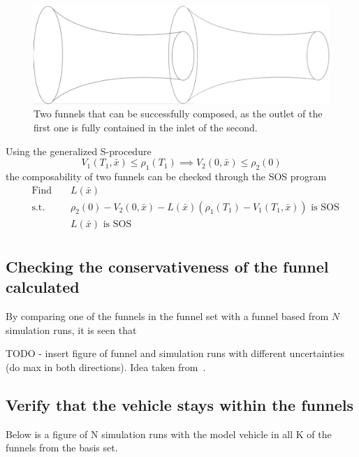 \begin{figure}
  \includegraphics[scale=.2]{figures/method/funnel-composition} \centering
  \caption{Two funnels that can be successfully composed, as the outlet of the
    first one is fully contained in the inlet of the second.}
  \label{fig:two-funnels-composed}
\end{figure}

Using the generalized S-procedure
\begin{equation}
  V_1(T_1,\bar{x}) \leq \rho_1(T_1) \implies V_2(0, \bar{x}) \leq \rho_2(0)
\end{equation}
the composability of two funnels can be checked through the \ac{SOS} program
\begin{align*}
    & \text{Find } && L(\bar{x}) \\
    & \text{s.t. } && \rho_2(0) - V_2(0,\bar{x}) - L(\bar{x})\left( \rho_1(T_1) - V_1(T_1,\bar{x}) \right) \text{ is SOS} \\
    &&& L(\bar{x}) \text{ is SOS} \\
\end{align*}

\subsection{Checking the conservativeness of the funnel calculated}

By comparing one of the funnels in the funnel set with a funnel based from \(N\)
simulation runs, it is seen that

TODO - insert figure of funnel and simulation runs with different uncertainties
(do max in both directions).
Idea taken from~\cite{mooreControlSynthesisVerification2012}.

\subsection{Verify that the vehicle stays within the funnels}

Below is a figure of N simulation runs with the model vehicle in all K of the
funnels from the basis set.

